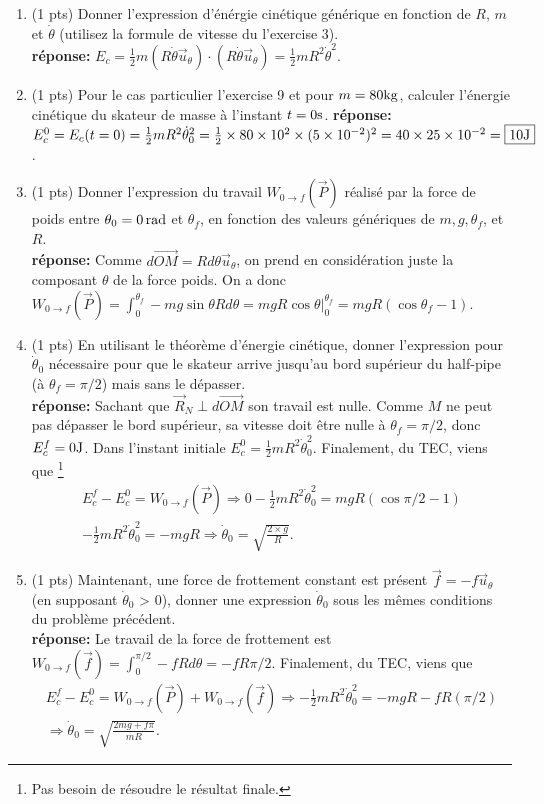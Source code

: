 \documentclass[french,10pt]{article}
\begin{document}
\begin{enumerate}
	\item (1 pts) Donner l'expression d'énérgie cinétique générique en fonction de $R$, $m$ et $\dot{\theta}$ (utilisez la formule de vitesse du l'exercise 3). \\
	\textbf{réponse:} $E_c = \frac{1}{2} m (R \dot{\theta}\vec{u}_{\theta}) \cdot (R \dot{\theta} \vec{u}_{\theta}) = \boxed{\frac{1}{2} m R^2 \dot{\theta}^2}$.
	\item (1 pts) Pour le cas particulier l'exercise 9 et pour $m=80 \rm kg$, calculer l'énergie cinétique du skateur de masse  à l'instant $t=0 \rm s$. 
	\textbf{réponse:} $E_c^0 = E_c(t=0) = \frac{1}{2} m R^2 \dot{\theta}_0^2 =  \frac{1}{2} \times 80 \times 10^2 \times (5\times 10^{-2})^2 = 40 \times 25 \times 10^{-2} = \boxed{10 \rm J}$.
	\item (1 pts) Donner l'expression du travail $W_{0\to f}(\vec{P})$ réalisé par la force de poids entre $\theta_0 = 0 \, \rm rad$ et $\theta_f$, en fonction des valeurs génériques de $m, g, \theta_f$, et $R$. \\
	\textbf{réponse:} Comme $d \vec{OM} = R d\theta \vec{u}_{\theta}$, on prend en considération juste la composant $\theta$ de la force poids. On a donc $W_{0\to f}(\vec{P}) = \displaystyle \int_{0}^{\theta_f} -mg \sin \theta R d \theta = mg R \cos \theta \big|_{0}^{\theta_f} = \boxed{m g R (\cos \theta_f - 1)}$.
	\item (1 pts) En utilisant le théorème d'énergie cinétique, donner l'expression pour $\dot{\theta}_{0}$ nécessaire pour que le skateur arrive jusqu'au bord supérieur du half-pipe (à $\theta_f = \pi/2$) mais sans le dépasser. \\
	\textbf{réponse:} Sachant que $\vec{R}_N \perp d \vec{OM}$ son travail est nulle. Comme $M$ ne peut pas dépasser le bord supérieur, sa vitesse doit être nulle à $\theta_f = \pi/2$, donc $E_c^f = 0 \rm J$. Dans l'instant initiale $E^0_c = \frac{1}{2} m R^2 \dot{\theta}_0^2$. Finalement, du TEC, viens que \footnote{Pas besoin de résoudre le résultat finale.}
	\begin{align*}
	E_c^f - E_c^0 = W_{0\to f}(\vec{P}) \Rightarrow 0 - \frac{1}{2} m R^2 \dot{\theta}_0^2 = m g R (\cos{\pi/2} - 1) \\
	- \frac{1}{2} m R^2 \dot{\theta}_0^2 = - m g R  \Rightarrow \boxed{\dot{\theta}_0 = \sqrt{\frac{2\times g}{R}}}.
 	\end{align*}
	\item (1 pts) Maintenant, une force de frottement constant est présent $\vec{f} = -f \vec{u}_{\theta}$ (en supposant $\dot{\theta}_{0}$ > 0), donner une expression $\dot{\theta}_{0}$ sous les mêmes conditions du problème précédent. \\
	\textbf{réponse:} Le travail de la force de frottement est $W_{0\to f}(\vec{f}) = \int_{0}^{\pi/2} -f R d\theta = -fR\pi/2$. Finalement, du TEC, viens que
	\begin{align*}
		E_c^f - E_c^0 = W_{0\to f}(\vec{P}) + W_{0\to f}(\vec{f})\Rightarrow - \frac{1}{2} m R^2 \dot{\theta}_0^2 = -m g R - f R (\pi/2) \\ \Rightarrow \boxed{\dot{\theta}_0 = \sqrt{\frac{2 m g + f\pi}{mR}}}.
	\end{align*}
	\end{enumerate}
		
\end{document}
